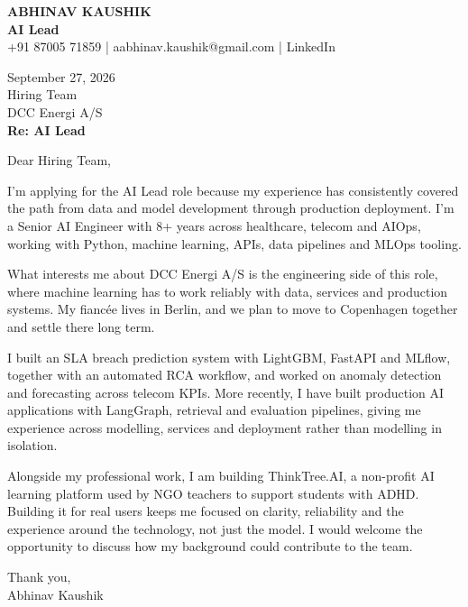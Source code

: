 \documentclass[10pt,a4paper]{article}
\begin{document}
\begin{center}
{\Large\bfseries ABHINAV KAUSHIK}\\[2pt]
{\bfseries AI Lead}\\[2pt]
+91 87005 71859 \quad | \quad aabhinav.kaushik@gmail.com \quad | \quad LinkedIn
\end{center}
\vspace{8pt}
September 27, 2026\\[6pt]
Hiring Team\\
DCC Energi A/S\\[4pt]
\textbf{Re: AI Lead}

Dear Hiring Team,

I’m applying for the AI Lead role because my experience has consistently covered the path from data and model development through production deployment. I’m a Senior AI Engineer with 8+ years across healthcare, telecom and AIOps, working with Python, machine learning, APIs, data pipelines and MLOps tooling.

What interests me about DCC Energi A/S is the engineering side of this role, where machine learning has to work reliably with data, services and production systems. My fiancée lives in Berlin, and we plan to move to Copenhagen together and settle there long term.

I built an SLA breach prediction system with LightGBM, FastAPI and MLflow, together with an automated RCA workflow, and worked on anomaly detection and forecasting across telecom KPIs. More recently, I have built production AI applications with LangGraph, retrieval and evaluation pipelines, giving me experience across modelling, services and deployment rather than modelling in isolation.

Alongside my professional work, I am building ThinkTree.AI, a non-profit AI learning platform used by NGO teachers to support students with ADHD. Building it for real users keeps me focused on clarity, reliability and the experience around the technology, not just the model. I would welcome the opportunity to discuss how my background could contribute to the team.

Thank you,\\
Abhinav Kaushik
\end{document}

